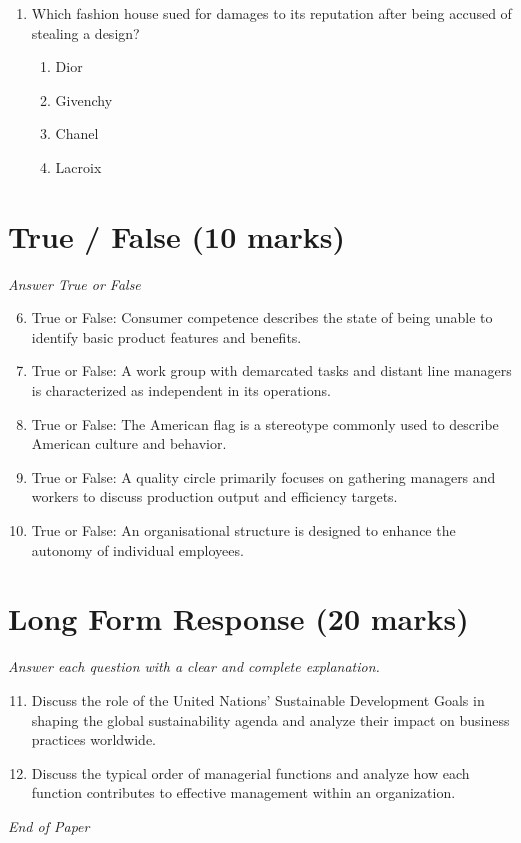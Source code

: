 \documentclass[12pt]{article}
\begin{document}
\begin{enumerate}[label=\arabic*.]
\begin{enumerate}[label=(\alph*)]
    \item Person-oriented
    \item Idea-oriented
    \item Message-oriented
\end{enumerate}
\item Which fashion house sued for damages to its reputation after being accused of stealing a design?
\begin{enumerate}[label=(\alph*)]
    \item Dior
    \item Givenchy
    \item Chanel
    \item Lacroix
\end{enumerate}
\end{enumerate}

\section*{True / False (10 marks)}
\textit{Answer True or False}
\begin{enumerate}[label=\arabic*.]
\setcounter{enumi}{5}
\item True or False: Consumer competence describes the state of being unable to identify basic product features and benefits.
\item True or False: A work group with demarcated tasks and distant line managers is characterized as independent in its operations.
\item True or False: The American flag is a stereotype commonly used to describe American culture and behavior.
\item True or False: A quality circle primarily focuses on gathering managers and workers to discuss production output and efficiency targets.
\item True or False: An organisational structure is designed to enhance the autonomy of individual employees.
\end{enumerate}

\section*{Long Form Response (20 marks)}
\textit{Answer each question with a clear and complete explanation.}
\begin{enumerate}[label=\arabic*.]
\setcounter{enumi}{10}
\item Discuss the role of the United Nations' Sustainable Development Goals in shaping the global sustainability agenda and analyze their impact on business practices worldwide.
\item Discuss the typical order of managerial functions and analyze how each function contributes to effective management within an organization.
\end{enumerate}

\vfill
\noindent\textit{End of Paper}
\end{document}
